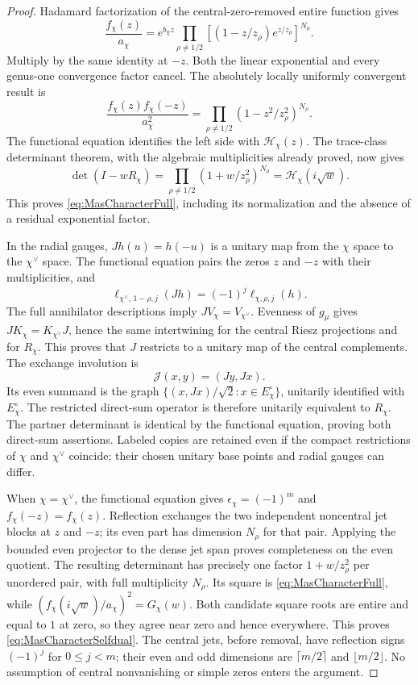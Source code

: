 \documentclass[11pt,a4paper]{article}
\begin{document}
\begin{proof}
Hadamard factorization of the central-zero-removed entire function gives
\[
 \frac{f_\chi(z)}{a_\chi}
 =e^{b_\chi z}\prod_{\rho\ne1/2}
 \left[(1-z/z_\rho)e^{z/z_\rho}\right]^{N_\rho}.
\]
Multiply by the same identity at $-z$. Both the linear exponential and every genus-one convergence factor cancel. The absolutely locally uniformly convergent result is
\[
 \frac{f_\chi(z)f_\chi(-z)}{a_\chi^2}
 =\prod_{\rho\ne1/2}(1-z^2/z_\rho^2)^{N_\rho}.
\]
The functional equation identifies the left side with $\mathcal H_\chi(z)$. The trace-class determinant theorem, with the algebraic multiplicities already proved, now gives
\[
 \det(I-wR_\chi)
 =\prod_{\rho\ne1/2}(1+w/z_\rho^2)^{N_\rho}
 =\mathcal H_\chi(i\sqrt w).
\]
This proves \eqref{eq:MasCharacterFull}, including its normalization and the absence of a residual exponential factor.

In the radial gauges, $J h(u)=h(-u)$ is a unitary map from the $\chi$ space to the $\chi^\vee$ space. The functional equation pairs the zeros $z$ and $-z$ with their multiplicities, and
\[
 \ell_{\chi^\vee,\,1-\rho,j}(Jh)=(-1)^j\ell_{\chi,\rho,j}(h).
\]
The full annihilator descriptions imply $JV_\chi=V_{\chi^\vee}$. Evenness of $g_\mu$ gives $JK_\chi=K_{\chi^\vee}J$, hence the same intertwining for the central Riesz projections and for $R_\chi$. This proves that $J$ restricts to a unitary map of the central complements. The exchange involution is
\[
 \mathcal J(x,y)=(Jy,Jx).
\]
Its even summand is the graph $\{(x,Jx)/\sqrt2:x\in E_\chi^\circ\}$, unitarily identified with $E_\chi^\circ$. The restricted direct-sum operator is therefore unitarily equivalent to $R_\chi$. The partner determinant is identical by the functional equation, proving both direct-sum assertions. Labeled copies are retained even if the compact restrictions of $\chi$ and $\chi^\vee$ coincide; their chosen unitary base points and radial gauges can differ.

When $\chi=\chi^\vee$, the functional equation gives $\epsilon_\chi=(-1)^m$ and $f_\chi(-z)=f_\chi(z)$. Reflection exchanges the two independent noncentral jet blocks at $z$ and $-z$; its even part has dimension $N_\rho$ for that pair. Applying the bounded even projector to the dense jet span proves completeness on the even quotient. The resulting determinant has precisely one factor $1+w/z_\rho^2$ per unordered pair, with full multiplicity $N_\rho$. Its square is \eqref{eq:MasCharacterFull}, while $(f_\chi(i\sqrt w)/a_\chi)^2=G_\chi(w)$. Both candidate square roots are entire and equal to $1$ at zero, so they agree near zero and hence everywhere. This proves \eqref{eq:MasCharacterSelfdual}. The central jets, before removal, have reflection signs $(-1)^j$ for $0\le j<m$; their even and odd dimensions are $\lceil m/2\rceil$ and $\lfloor m/2\rfloor$. No assumption of central nonvanishing or simple zeros enters the argument.
\end{proof}
\end{document}
